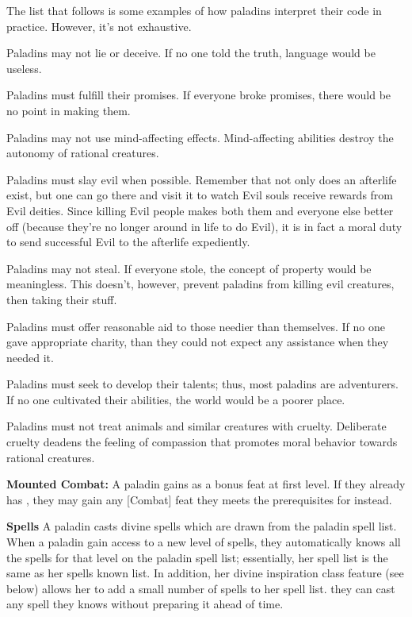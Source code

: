 The list that follows is some examples of how paladins interpret their code in practice. However, it's not exhaustive.
\begin{itemize*}
\item Paladins may not lie or deceive. If no one told the truth, language would be useless.
\item Paladins must fulfill their promises. If everyone broke promises, there would be no point in making them.
\item Paladins may not use mind-affecting effects. Mind-affecting abilities destroy the autonomy of rational creatures.
\item Paladins must slay evil when possible. Remember that not only does an afterlife exist, but one can go there and visit it to watch Evil souls receive rewards from Evil deities. Since killing Evil people makes both them and everyone else better off (because they're no longer around in life to do Evil), it is in fact a moral duty to send successful Evil to the afterlife expediently.
\item Paladins may not steal. If everyone stole, the concept of property would be meaningless. This doesn't, however, prevent paladins from killing evil creatures, then taking their stuff.
\item Paladins must offer reasonable aid to those needier than themselves. If no one gave appropriate charity, than they could not expect any assistance when they needed it.
\item Paladins must seek to develop their talents; thus, most paladins are adventurers. If no one cultivated their abilities, the world would be a poorer place.
\item Paladins must not treat animals and similar creatures with cruelty. Deliberate cruelty deadens the feeling of compassion that promotes moral behavior towards rational creatures.
\end{itemize*}

\textbf{Mounted Combat:} A paladin gains  as a bonus feat at first level. If they already has , they may gain any [Combat] feat they meets the prerequisites for instead.

\textbf{Spells} A paladin casts divine spells which are drawn from the paladin spell list. When a paladin gain access to a new level of spells, they automatically knows all the spells for that level on the paladin spell list; essentially, her spell list is the same as her spells known list. In addition, her divine inspiration class feature (see below) allows her to add a small number of spells to her spell list. they can cast any spell they knows without preparing it ahead of time.

